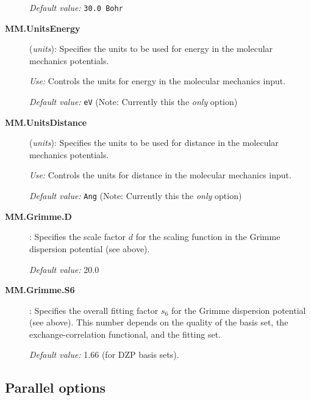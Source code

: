 \documentclass[11pt]{article}
\begin{document}
\begin{description}
{\it Default value:}  {\tt 30.0 Bohr}

\item[{\bf MM.UnitsEnergy}] ({\it units}):  Specifies the units to be used for energy in the
molecular mechanics potentials.

{\it Use:} Controls the units for energy in the molecular mechanics input.

{\it Default value:}  {\tt eV} (Note: Currently this the {\em only} option)

\item[{\bf MM.UnitsDistance}] ({\it units}):  Specifies the units to be used for distance in the
molecular mechanics potentials.

{\it Use:} Controls the units for distance in the molecular mechanics input.

{\it Default value:}  {\tt Ang} (Note: Currently this the {\em only} option)

\item[{\bf MM.Grimme.D}] :  Specifies the scale factor $d$ for the scaling function
in the Grimme dispersion potential (see above).

{\it Default value:}  { 20.0 }

\item[{\bf MM.Grimme.S6}] :  Specifies the overall fitting factor $s_6$ for the
Grimme dispersion potential (see above). This number depends on the
quality of the basis set, the exchange-correlation functional, and the
fitting set.

{\it Default value:}  { 1.66 } (for DZP basis sets).

\end{description}

\vspace{5pt}
\subsection{Parallel options}
\end{document}
